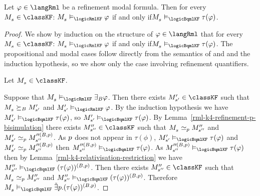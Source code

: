 \begin{theorem}\label{rml-k4-bqml-translation}
Let $\phi \in \langRml$ be a refinement modal formula.
Then for every $\kPModel{\kStateS} \in \classKF$: $\kPModel{\kStateS} \entails_\logicRmlKF \phi$ if and only if$\kPModel{\kStateS} \entails_\logicBqmlKF \tau(\phi)$.
\end{theorem}

\begin{proof}
We show by induction on the structure of $\phi \in \langRml$ that for every $\kPModel{\kStateS} \in \classKF$: $\kPModel{\kStateS} \entails_\logicRmlKF \phi$ if and only if$\kPModel{\kStateS} \entails_\logicBqmlKF \tau(\phi)$.
The propositional and modal cases follow directly from the semantics of \logicRmlKF{} and \logicBqmlKF{} and the induction hypothesis, so we show only the case involving refinement quantifiers.

Let $\kPModel{\kStateS} \in \classKF$.

Suppose that $\kPModel{\kStateS} \entails_\logicRmlKF \somerefsBs \phi$.
Then there exists $\kPModelP{\kStateSP} \in \classKF$ such that $\kPModel{\kStateS} \simulatesBs \kPModelP{\kStateSP}$ and $\kPModelP{\kStateSP} \entails_\logicRmlKF \phi$.
By the induction hypothesis we have $\kPModelP{\kStateSP} \entails_\logicBqmlKF \tau(\phi)$, so $\kPModelP{\kStateSP} \entails_\logicBqmlKF \tau(\phi)$.
By Lemma~\ref{rml-k4-refinement-p-bisimulation} there exists $\kPModelPP{\kStateSPP} \in \classKF$ such that $\kPModel{\kStateS} \bisimilar[\atomP] \kPModelPP{\kStateSPP}$ and $\kPModelP{\kStateSP} \bisimilar[\atomP] \kPModel[\prime\prime(\agentsB, \atomP)]{\kStateSPP}$.
As $\atomP$ does not appear in $\tau(\phi)$, $\kPModelP{\kStateSP} \entails_\logicBqmlKF \tau(\phi)$ and $\kPModelP{\kStateSP} \bisimilar[\atomP] \kPModel[\prime\prime(\agentsB, \atomP)]{\kStateSPP}$ then $\kPModel[\prime\prime(\agentsB, \atomP)]{\kStateSPP} \entails_\logicBqmlKF \tau(\phi)$.
As $\kPModel[\prime\prime(\agentsB, \atomP)]{\kStateSPP} \entails_\logicBqmlKF \tau(\phi)$ then by Lemma~\ref{rml-k4-relativisation-restriction} we have $\kPModelPP{\kStateSPP} \entails_\logicBqmlKF (\tau(\phi))^{(\agentsB, \atomP)}$.
Then there exists $\kPModelPP{\kStateSPP} \in \classKF$ such that $\kPModel{\kStateS} \bisimilar[\atomP] \kPModelPP{\kStateSPP}$ and $\kPModelPP{\kStateSPP} \entails_\logicBqmlKF (\tau(\phi))^{(\agentsB, \atomP)}$.
Therefore $\kPModel{\kStateS} \entails_\logicBqmlKF \somebisimsP (\tau(\phi))^{(\agentsB, \atomP)}$.


\end{proof}
